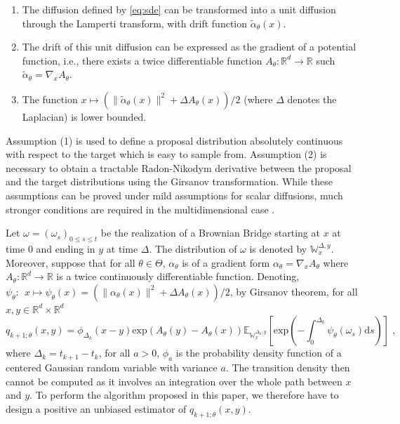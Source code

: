 \documentclass[12pt]{article}
\def\Xset{\mathbb{R}^d}
\newcommand{\parvec}{\theta}
\newcommand{\parspace}{\Theta}
\newcommand{\hd}[1]{q_{#1}}
\newcommand{\rset}{\ensuremath{\mathbb{R}}}
\newcommand{\rmd}{\ensuremath{\mathrm{d}}}
\newcommand{\eqsp}{\;}
\begin{document}
\begin{enumerate}
\item The diffusion defined by \eqref{eq:sde} can be transformed into a unit diffusion through the Lamperti transform, with drift function $\tilde{\alpha}_\parvec(x)$.
\item The drift of this unit diffusion can be expressed as the gradient of a potential function, i.e., there exists a twice differentiable function $A_{\parvec}:\mathbb{R}^d \to \rset$ such $\tilde{\alpha}_{\parvec} = \nabla_x A_{\parvec}$.
\item The function $x\mapsto (\|\tilde{\alpha}_{\parvec}(x)\|^2 + \Delta A_{\parvec}(x))/2$ (where $\Delta$ denotes the Laplacian) is lower bounded.
\end{enumerate}

Assumption (1)
 is used to define a proposal distribution absolutely continuous with respect to the target which is easy to sample from. 
Assumption (2)
 is necessary to obtain a tractable Radon-Nikodym derivative between the proposal and the target distributions using the Girsanov transformation. 
 While these assumptions can be proved under mild assumptions for scalar diffusions, much stronger conditions are required in the multidimensional case \cite{ait-sahalia2008closed}. 


Let $\omega = (\omega_s)_{0 \leq s \leq t}$ be the realization of a Brownian Bridge starting at $x$ at time 0 and ending in $y$ at time $\Delta$. The distribution of $\omega$ is denoted by  $\mathbb{W}_x^{\Delta,y}$. 
Moreover, suppose that for all $\parvec\in\parspace$, $\alpha_{\parvec}$ is of a gradient form $\alpha_{\parvec} = \nabla_x A_{\parvec}$ where $A_{\parvec}:\Xset \to \rset$ is a twice continuously differentiable function. Denoting, $ \psi_\theta:~~x \mapsto  \psi_\theta(x) = (\|\alpha_{\parvec}(x)\|^2 + \Delta A_{\parvec}(x))/2$, by Girsanov theorem, for all $x, y \in \mathbb{R}^d \times \mathbb{R}^d$
\begin{equation}
\label{eq:q:girsanov}
\hd{k+1;\parvec}(x,y) = \phi_{\Delta_k}(x-y)\mathrm{exp}\left(A_{\parvec}(y) - A_{\parvec}(x)\right)\mathbb{E}_{\mathbb{W}_x^{\Delta_k,y}}\left[\mathrm{exp}\left(-\int_0^{\Delta_k} \psi_{\parvec}(\omega_s)\rmd s\right)\right]\eqsp,
\end{equation}
where $\Delta_k = t_{k+1}-t_k$, for all $a>0$, $\phi_a$ is the probability density function of a centered Gaussian random variable with variance $a$. The transition density then cannot be computed as it involves an integration over the whole path between $x$ and $y$. 
To perform the algorithm proposed in this paper, we therefore have to design a positive an unbiased estimator of $\hd{k+1;\parvec}(x,y)$. 
\end{document}
